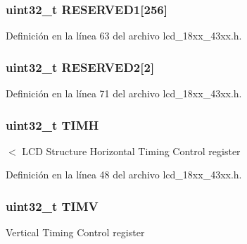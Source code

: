 \subsubsection[{\texorpdfstring{R\+E\+S\+E\+R\+V\+E\+D1}{RESERVED1}}]{ uint32\+\_\+t R\+E\+S\+E\+R\+V\+E\+D1\mbox{[}256\mbox{]}}\hypertarget{struct_l_p_c___l_c_d___t_ae1f240929d622b86f99da0f6eaa11084}{}\label{struct_l_p_c___l_c_d___t_ae1f240929d622b86f99da0f6eaa11084}


Definición en la línea 63 del archivo lcd\+\_\+18xx\+\_\+43xx.\+h.

\subsubsection[{\texorpdfstring{R\+E\+S\+E\+R\+V\+E\+D2}{RESERVED2}}]{ uint32\+\_\+t R\+E\+S\+E\+R\+V\+E\+D2\mbox{[}2\mbox{]}}\hypertarget{struct_l_p_c___l_c_d___t_a9c89d8514e7f2732c6cb573cd4602af2}{}\label{struct_l_p_c___l_c_d___t_a9c89d8514e7f2732c6cb573cd4602af2}


Definición en la línea 71 del archivo lcd\+\_\+18xx\+\_\+43xx.\+h.

\subsubsection[{\texorpdfstring{T\+I\+MH}{TIMH}}]{ uint32\+\_\+t T\+I\+MH}\hypertarget{struct_l_p_c___l_c_d___t_ad6a543c03e5f15efbde1aadd082d1857}{}\label{struct_l_p_c___l_c_d___t_ad6a543c03e5f15efbde1aadd082d1857}
$<$ L\+CD Structure Horizontal Timing Control register 

Definición en la línea 48 del archivo lcd\+\_\+18xx\+\_\+43xx.\+h.

\subsubsection[{\texorpdfstring{T\+I\+MV}{TIMV}}]{ uint32\+\_\+t T\+I\+MV}\hypertarget{struct_l_p_c___l_c_d___t_a9a5144cc60b76ed64885655d40326bbb}{}\label{struct_l_p_c___l_c_d___t_a9a5144cc60b76ed64885655d40326bbb}
Vertical Timing Control register 

